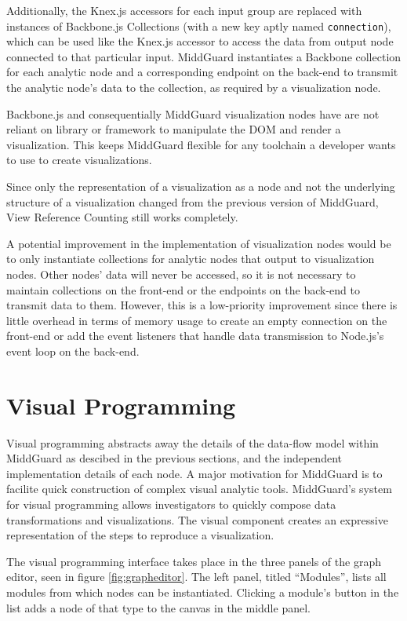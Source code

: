 \documentclass[midd]{thesis}
\begin{document}
Additionally, the Knex.js accessors for each input group are replaced with
instances of Backbone.js Collections (with a new key aptly named
\texttt{connection}), which can be used like the Knex.js accessor to access the
data from output node connected to that particular input. MiddGuard instantiates
a Backbone collection for each analytic node and a corresponding endpoint on the
back-end to transmit the analytic node's data to the collection, as required by
a visualization node.

Backbone.js and consequentially MiddGuard visualization nodes have are not
reliant on library or framework to manipulate the DOM and render a
visualization. This keeps MiddGuard flexible for any toolchain a developer wants
to use to create visualizations.

Since only the representation of a visualization as a node and not the
underlying structure of a visualization changed from the previous version of
MiddGuard, View Reference Counting still works completely.

A potential improvement in the implementation of visualization nodes would be to
only instantiate collections for analytic nodes that output to visualization
nodes. Other nodes' data will never be accessed, so it is not necessary to
maintain collections on the front-end or the endpoints on the back-end to
transmit data to them. However, this is a low-priority improvement since there
is little overhead in terms of memory usage to create an empty connection on the
front-end or add the event listeners that handle data transmission to Node.js's
event loop on the back-end.

\section{Visual Programming}

Visual programming abstracts away the details of the data-flow model within
MiddGuard as descibed in the previous sections, and the independent
implementation details of each node. A major motivation for MiddGuard is to
facilite quick construction of complex visual analytic tools. MiddGuard's system
for visual programming allows investigators to quickly compose data
transformations and visualizations. The visual component creates an expressive
representation of the steps to reproduce a visualization.

The visual programming interface takes place in the three panels of the graph
editor, seen in figure \ref{fig:grapheditor}. The left panel, titled
``Modules'', lists all modules from which nodes can be instantiated. Clicking a
module's button in the list adds a node of that type to the canvas in the middle
panel.
\end{document}

